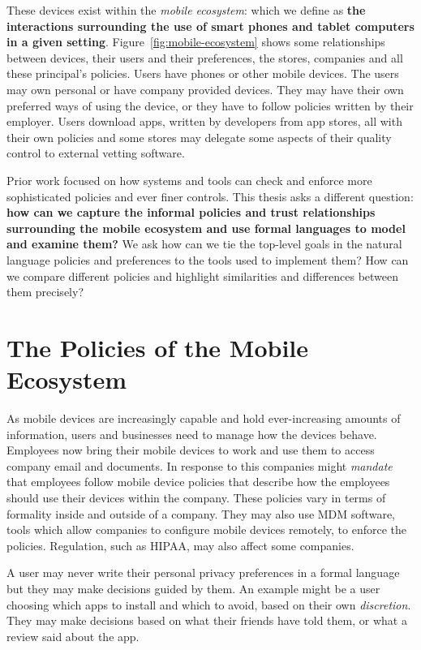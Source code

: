 \documentclass[thesis.tex]{subfiles}
\begin{document}
These devices exist within the \emph{mobile ecosystem}: which we define as
\textbf{the interactions surrounding the use of smart phones and tablet
computers in a given setting}. Figure~\ref{fig:mobile-ecosystem} shows some relationships
between devices, their users and their preferences, the stores, companies and
all these principal's policies. Users have phones or other mobile devices. The users
may own personal or have company provided devices. They may have their own
preferred ways of using the device, or they have to follow policies written
by their employer. Users download apps, written by developers from app stores,
all with their own policies and some stores may delegate some aspects of
their quality control to external vetting software.

Prior work focused on how systems and tools can check and enforce more
sophisticated policies and ever finer controls. This thesis asks a different
question: \textbf{how can we capture the informal policies and trust
relationships surrounding the mobile ecosystem and use formal languages to model
and examine them?} We ask how can we tie the top-level goals in the natural
language policies and preferences to the tools used to implement them? How can
we compare different policies and highlight similarities and differences between
them precisely?

\section{The Policies of the Mobile Ecosystem}

As mobile devices are increasingly capable and hold ever-increasing amounts of
information, users and businesses need to manage how the devices behave.
Employees now bring their mobile devices to work and use them to access company
email and documents. In response to this companies might \emph{mandate} that
employees follow mobile device policies that describe how the employees should
use their devices within the company. These policies vary in terms of formality
inside and outside of a company. 
They may also use \ac{MDM} software, tools which allow companies to configure
mobile devices remotely, to enforce the policies. Regulation, such as
\ac{HIPAA}, may also affect some companies.

A user may never write their personal privacy preferences in a formal language
but they may make decisions guided by them. An example might be a user choosing
which apps to install and which to avoid, based on their own \emph{discretion}.
They may make decisions based on what their friends have told them, or what a
review said about the app.
\end{document}
